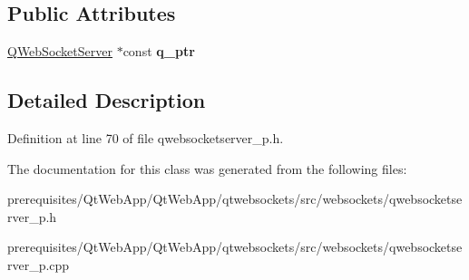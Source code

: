 \subsection*{Public Attributes}
\begin{DoxyCompactItemize}
\item 
\mbox{\label{class_q_web_socket_server_private_a6026158ac4639176bc793fee3caa9cfc}} 
\mbox{\hyperlink{class_q_web_socket_server}{Q\+Web\+Socket\+Server}} $\ast$const {\bfseries q\+\_\+ptr}
\end{DoxyCompactItemize}


\subsection{Detailed Description}


Definition at line 70 of file qwebsocketserver\+\_\+p.\+h.



The documentation for this class was generated from the following files\+:\begin{DoxyCompactItemize}
\item 
prerequisites/\+Qt\+Web\+App/\+Qt\+Web\+App/qtwebsockets/src/websockets/qwebsocketserver\+\_\+p.\+h\item 
prerequisites/\+Qt\+Web\+App/\+Qt\+Web\+App/qtwebsockets/src/websockets/qwebsocketserver\+\_\+p.\+cpp\end{DoxyCompactItemize}
